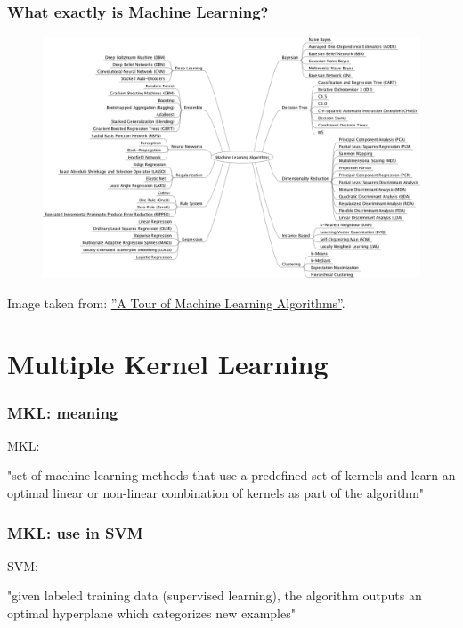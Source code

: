 \documentclass{beamer}
\begin{document}
\begin{frame}
\frametitle{What exactly is Machine Learning?}
\begin{figure}
\includegraphics[width=0.9\linewidth]{MachineLearningAlgorithms}
\end{figure}
Image taken from: \hyperref[http://machinelearningmastery.com/a-tour-of-machine-learning-algorithms/]{''A Tour of Machine Learning Algorithms''}.
\end{frame}


%
%



\section{Multiple Kernel Learning}


\begin{frame}
\frametitle{MKL: meaning}

MKL:

"set of machine learning methods that use a predefined set of kernels and learn an optimal linear or non-linear combination of kernels as part of the algorithm"

\end{frame}



\begin{frame}
\frametitle{MKL: use in SVM}

SVM:

"given labeled training data (supervised learning), the algorithm outputs an optimal hyperplane which categorizes new examples"

\end{frame}


\end{document}

